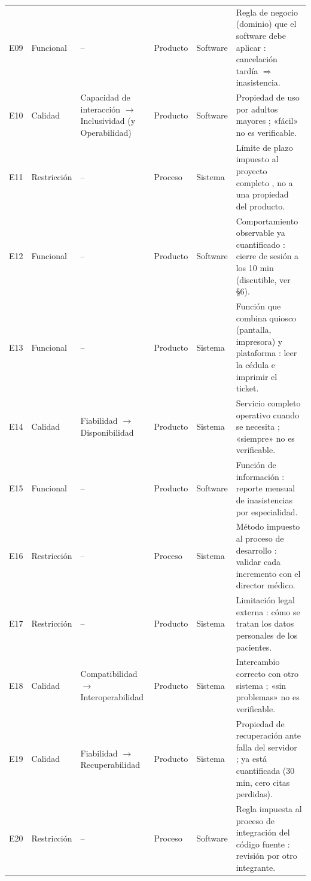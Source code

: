 \documentclass[11pt,a4paper]{article}
\begin{document}
\begin{longtable}{@{}p{0.95cm}p{1.75cm}p{3.1cm}p{1.45cm}p{1.35cm}p{7.6cm}@{}}
E09 & Funcional & -- & Producto & Software & Regla de negocio (dominio) que el software debe aplicar \cite{iso29148}: cancelación tardía $\Rightarrow$ inasistencia.\\
E10 & Calidad & Capacidad de interacción $\rightarrow$ Inclusividad (y Operabilidad) & Producto & Software & Propiedad de uso por adultos mayores \cite{iso25010}; «fácil» no es verificable.\\
E11 & Restricción & -- & Proceso & Sistema & Límite de plazo impuesto al proyecto completo \cite{iso29148}, no a una propiedad del producto.\\
E12 & Funcional & -- & Producto & Software & Comportamiento observable ya cuantificado \cite{iso29148}: cierre de sesión a los 10 min (discutible, ver §6).\\
E13 & Funcional & -- & Producto & Sistema & Función que combina quiosco (pantalla, impresora) y plataforma \cite{iso29148}: leer la cédula e imprimir el ticket.\\
E14 & Calidad & Fiabilidad $\rightarrow$ Disponibilidad & Producto & Sistema & Servicio completo operativo cuando se necesita \cite{iso25010}; «siempre» no es verificable.\\
E15 & Funcional & -- & Producto & Software & Función de información \cite{iso29148}: reporte mensual de inasistencias por especialidad.\\
E16 & Restricción & -- & Proceso & Sistema & Método impuesto al proceso de desarrollo \cite{iso29148}: validar cada incremento con el director médico.\\
E17 & Restricción & -- & Producto & Sistema & Limitación legal externa \cite{iso29148,lopdp}: cómo se tratan los datos personales de los pacientes.\\
E18 & Calidad & Compatibilidad $\rightarrow$ Interoperabilidad & Producto & Sistema & Intercambio correcto con otro sistema \cite{iso25010}; «sin problemas» no es verificable.\\
E19 & Calidad & Fiabilidad $\rightarrow$ Recuperabilidad & Producto & Sistema & Propiedad de recuperación ante falla del servidor \cite{iso25010}; ya está cuantificada (30 min, cero citas perdidas).\\
E20 & Restricción & -- & Proceso & Software & Regla impuesta al proceso de integración del código fuente \cite{iso29148}: revisión por otro integrante.\\
\end{longtable}
\endgroup

\end{document}
